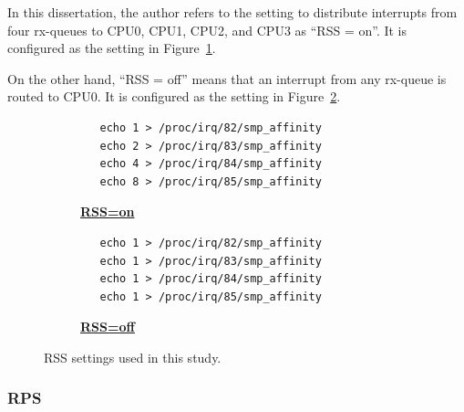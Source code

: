 In this dissertation, the author refers to the setting to distribute interrupts from four rx-queues to CPU0, CPU1, CPU2, and CPU3 as \enquote{RSS = on}.
It is configured as the setting in Figure~\ref{fig:rss=on}. 

On the other hand, \enquote{RSS = off} means that an interrupt from any rx-queue is routed to CPU0. 
It is configured as the setting in Figure~\ref{fig:rss=off}. 

\begin{figure}[h]

  \begin{subfigure}[t]{\columnwidth}
    \centering
    \begin{minipage}{0.6\columnwidth}
\begin{verbatim}
   echo 1 > /proc/irq/82/smp_affinity
   echo 2 > /proc/irq/83/smp_affinity
   echo 4 > /proc/irq/84/smp_affinity
   echo 8 > /proc/irq/85/smp_affinity
\end{verbatim}
    \end{minipage}
    \caption{\underline{\textbf{RSS=on}}}
    \label{fig:rss=on}
  \end{subfigure}

  \par\bigskip

  \begin{subfigure}[t]{\columnwidth}
    \centering
    \begin{minipage}{0.6\columnwidth}
\begin{verbatim}
   echo 1 > /proc/irq/82/smp_affinity
   echo 1 > /proc/irq/83/smp_affinity
   echo 1 > /proc/irq/84/smp_affinity
   echo 1 > /proc/irq/85/smp_affinity
\end{verbatim}
    \end{minipage}
    \caption{\underline{\textbf{RSS=off}}}
    \label{fig:rss=off}
  \end{subfigure}

  \par\bigskip
  \centering
  \begin{minipage}{0.9\columnwidth}
    \caption[RSS settings]{
      RSS settings used in this study.
    }
    \label{fig:rss_settings}
  \end{minipage}

  \par\bigskip
\end{figure}

\subsubsection{RPS}

